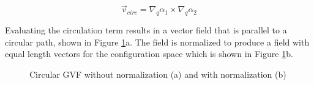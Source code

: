 \documentclass[numbered,pdftex]{ohio-etd}
\begin{document}
\begin{equation}
\vec{v}_{circ} =  \nabla_q\alpha_1 \times \nabla_q\alpha_2 
\label{circOnlySimp}
\end{equation}


Evaluating the circulation term results in a vector field that is parallel to a circular path, shown in Figure \ref{fig:gvfCircCirculation}a. The field is normalized to produce a field with equal length vectors for the configuration space which is shown in Figure \ref{fig:gvfCircCirculation}b. 

\begin{figure}[H]
	\begin{subfigmatrix}{2}%
		\centering	
		\hspace*{0mm}
	\end{subfigmatrix}
	\caption{Circular GVF without normalization (a) and with normalization (b)}
	\label{fig:gvfCircCirculation}
\end{figure}
\end{document}
